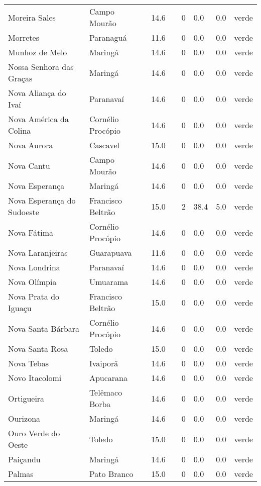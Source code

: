 \begin{longtable}{l|lllllll}
  Moreira Sales & Campo Mourão & 14.6 &  & 0 & 0.0 & 0.0 & verde \\ 
  Morretes & Paranaguá & 11.6 &  & 0 & 0.0 & 0.0 & verde \\ 
  Munhoz de Melo & Maringá & 14.6 &  & 0 & 0.0 & 0.0 & verde \\ 
  Nossa Senhora das Graças & Maringá & 14.6 &  & 0 & 0.0 & 0.0 & verde \\ 
  Nova Aliança do Ivaí & Paranavaí & 14.6 &  & 0 & 0.0 & 0.0 & verde \\ 
  Nova América da Colina & Cornélio Procópio & 14.6 &  & 0 & 0.0 & 0.0 & verde \\ 
  Nova Aurora & Cascavel & 15.0 &  & 0 & 0.0 & 0.0 & verde \\ 
  Nova Cantu & Campo Mourão & 14.6 &  & 0 & 0.0 & 0.0 & verde \\ 
  Nova Esperança & Maringá & 14.6 &  & 0 & 0.0 & 0.0 & verde \\ 
  Nova Esperança do Sudoeste & Francisco Beltrão & 15.0 &  & 2 & 38.4 & 5.0 & verde \\ 
  Nova Fátima & Cornélio Procópio & 14.6 &  & 0 & 0.0 & 0.0 & verde \\ 
  Nova Laranjeiras & Guarapuava & 11.6 &  & 0 & 0.0 & 0.0 & verde \\ 
  Nova Londrina & Paranavaí & 14.6 &  & 0 & 0.0 & 0.0 & verde \\ 
  Nova Olímpia & Umuarama & 14.6 &  & 0 & 0.0 & 0.0 & verde \\ 
  Nova Prata do Iguaçu & Francisco Beltrão & 15.0 &  & 0 & 0.0 & 0.0 & verde \\ 
  Nova Santa Bárbara & Cornélio Procópio & 14.6 &  & 0 & 0.0 & 0.0 & verde \\ 
  Nova Santa Rosa & Toledo & 15.0 &  & 0 & 0.0 & 0.0 & verde \\ 
  Nova Tebas & Ivaiporã & 14.6 &  & 0 & 0.0 & 0.0 & verde \\ 
  Novo Itacolomi & Apucarana & 14.6 &  & 0 & 0.0 & 0.0 & verde \\ 
  Ortigueira & Telêmaco Borba & 14.6 &  & 0 & 0.0 & 0.0 & verde \\ 
  Ourizona & Maringá & 14.6 &  & 0 & 0.0 & 0.0 & verde \\ 
  Ouro Verde do Oeste & Toledo & 15.0 &  & 0 & 0.0 & 0.0 & verde \\ 
  Paiçandu & Maringá & 14.6 &  & 0 & 0.0 & 0.0 & verde \\ 
  Palmas & Pato Branco & 15.0 &  & 0 & 0.0 & 0.0 & verde \\ 

\end{longtable}
